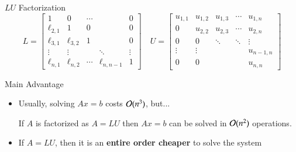 \documentclass[10pt]{beamer}
\begin{document}
\begin{frame}{$LU$ Factorization}
\begin{equation*}
    L = \begin{bmatrix}   1       &     0      & \cdots &             & 0 \\
                       \ell_{2,1} &     1      &   0    &             & 0 \\
                       \ell_{3,1} & \ell_{3,2} &   1    &             & 0 \\
                          \vdots  &  \vdots    &        & \ddots      & \vdots  \\
                       \ell_{n,1} & \ell_{n,2} & \cdots & \ell_{n,n-1} & 1
        \end{bmatrix} \quad 
    U = \begin{bmatrix} u_{1,1} & u_{1,2} & u_{1,3} & \cdots & u_{1,n} \\
                          0     & u_{2,2} & u_{2,3} & \cdots & u_{2,n} \\
                          0     &   0     & \ddots  & \ddots & \vdots \\
                         \vdots & \vdots  &         &        & u_{n-1,n} \\
                          0     &   0     &         &        & u_{n,n}
        \end{bmatrix}
\end{equation*}
\end{frame}
\begin{frame}{Main Advantage}

\begin{itemize}
    \item Usually, solving $Ax=b$ costs ${\mathcal{O}}(n^3)$, but...
\begin{theorem}
    If $A$ is factorized as $A=LU$ then $Ax=b$ can be solved in ${\mathcal{O}}(n^2)$ operations.
\end{theorem}
\vspace{3mm}
        \item If $A=LU$, then it is an \textbf{entire order cheaper} to solve the system
    \end{itemize}
\vspace{3mm}
\end{frame}
\end{document}
